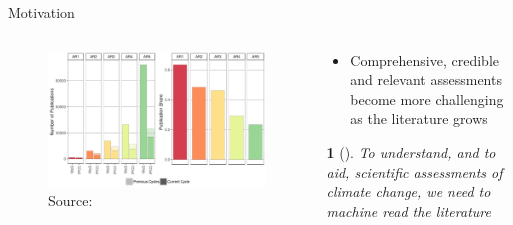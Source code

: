 \documentclass[9pt]{beamer}
\newtheorem*{remark}{}
\begin{document}
\begin{frame}{Motivation}

\begin{columns}
	\begin{column}{0.5\linewidth}
		\begin{center}
\begin{figure}
	\includegraphics[width=0.85\linewidth]{merged_IPCC_spectral.png}
	\caption{Source: \citet{Minx2017l} }
\end{figure}
		\end{center}
	\end{column}
	\begin{column}{0.5\linewidth}
		\begin{center}
			\begin{itemize}
				\item Comprehensive, credible and relevant assessments become
				more challenging as the literature grows
			\end{itemize}
		\begin{remark}[]
			To understand, and to aid, scientific assessments of climate change, we need to machine read the literature
		\end{remark}
		\end{center}
	\end{column}
\end{columns}

\end{frame}
\end{document}
